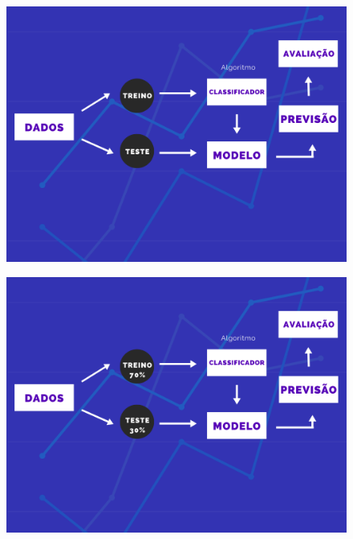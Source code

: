 \documentclass[compress]{beamer}
\begin{document}
\begin{frame}{}
    \begin{figure}
        \centering
        \includegraphics[scale=.39]{img/7.png}
    \end{figure}
\end{frame}
\begin{frame}{}
    \begin{figure}
        \centering
        \includegraphics[scale=.39]{img/8.png}
    \end{figure}
\end{frame}
\end{document}
